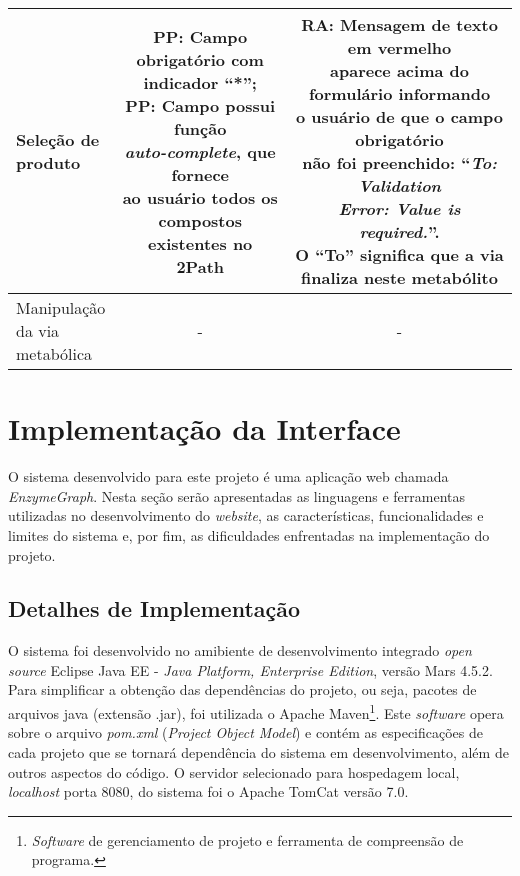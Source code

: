 \begin{table}
\begin{tabular}{|l|c|c|}
\specialcell{Seleção de\\produto} & \specialcell{\textbf{PP}: Campo obrigatório com\\indicador ``*'';\\\textbf{PP}: Campo possui função\\\textit{auto-complete}, que fornece\\ao usuário todos os\\compostos existentes no\\2Path} & \specialcell{\textbf{RA}: Mensagem de texto em vermelho \\aparece acima do formulário informando\\o usuário de que o campo obrigatório\\não foi preenchido: ``\textit{To: Validation}\\\textit{Error: Value is required.}''.\\O ``To'' significa que a via\\finaliza neste metabólito} \\ \hline

\specialcell{Manipulação\\da via\\metabólica} & - & - \\ \hline
\end{tabular}
\end{table}


\section{Implementação da Interface} \label{implementacao}


\indent O sistema desenvolvido para este projeto é uma aplicação web chamada \textit{EnzymeGraph}. Nesta seção serão apresentadas as linguagens e ferramentas utilizadas no desenvolvimento do \textit{website}, as características, funcionalidades e limites do sistema e, por fim, as dificuldades enfrentadas na implementação do projeto.

\subsection{Detalhes de Implementação}

\indent O sistema foi desenvolvido no amibiente de desenvolvimento integrado \textit{open source} Eclipse Java EE - \textit{Java Platform, Enterprise Edition}, versão Mars 4.5.2. Para simplificar a obtenção das dependências do projeto, ou seja, pacotes de arquivos java (extensão .jar), foi utilizada o Apache Maven\footnote{\textit{Software} de gerenciamento de projeto e ferramenta de compreensão de programa.}. Este \textit{software} opera sobre o arquivo \textit{pom.xml} (\textit{Project Object Model}) e contém as especificações de cada projeto que se tornará dependência do sistema em desenvolvimento, além de outros aspectos do código. O servidor selecionado para hospedagem local, \textit{localhost} porta 8080, do sistema foi o Apache TomCat versão 7.0.


